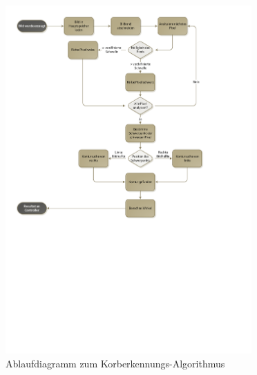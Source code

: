 		\begin{figure}[h!]
			\centering
			\includegraphics[width=0.84\textwidth,clip,trim=9mm 115mm 41mm 9mm]
			{Enddokumentation/Loesungskonzept/Bilder/Flowchart_Korberkennung.pdf}
			\caption{Ablaufdiagramm zum Korberkennungs-Algorithmus}
			\label{fig:KorberkennungFlowchart}
		\end{figure}
		\newpage